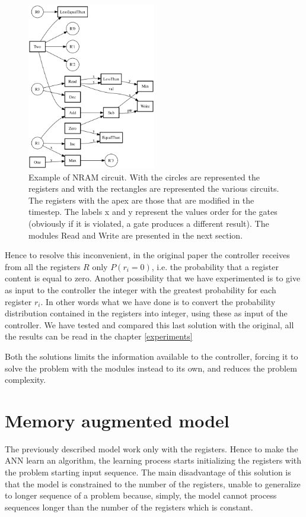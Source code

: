 \begin{figure}
	\centering
	\includegraphics[width=0.5\textwidth]{figures/circuit.png}
	\caption{Example of NRAM circuit. With the circles are represented the registers and with the rectangles are represented the various circuits. The registers with the apex are those that are modified in the timestep. The labels x and y represent the values order for the gates (obviously if it is violated, a gate produces a different result). The modules Read and Write are presented in the next section.}
	\label{fig:example-circuit}
\end{figure}

Hence to resolve this inconvenient, in the original paper the controller receives from all the registers $R$ only $P(r_{i} = 0)$, i.e. the probability that a register content is equal to zero. Another possibility that we have experimented is to give as input to the controller the integer with the greatest probability for each register $r_{i}$. In other words what we have done is to convert the probability distribution contained in the registers into integer, using these as input of the controller. We have tested and compared this last solution with the original, all the results can be read in the chapter \ref{experiments}

Both the solutions limits the information available to the controller, forcing it to solve the problem with the modules instead to its own, and reduces the problem complexity.

\section{Memory augmented model}\label{sec:nram-memory}
The previously described model work only with the registers. Hence to make the ANN learn an algorithm, the learning process starts initializing the registers with the problem starting input sequence. The main disadvantage of this solution is that the model is constrained to the number of the registers, unable to generalize to longer sequence of a problem because, simply, the model cannot process sequences longer than the number of the registers which is constant.

